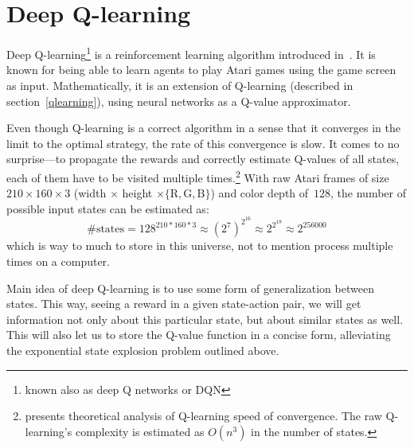 \chapter{Deep Q-learning}\label{dqn}
Deep Q-learning\footnote{known also as deep Q networks or DQN} is a reinforcement learning algorithm introduced in~\cite{nips-dqn}. It is known for being able to learn agents to play Atari games using the game screen as input. Mathematically, it is an extension of Q-learning (described in section~\ref{qlearning}), using neural networks as a Q-value approximator.

Even though Q-learning is a correct algorithm in a sense that it converges in the limit to the optimal strategy, the rate of this convergence is slow. It comes to no surprise---to propagate the rewards and correctly estimate Q-values of all states, each of them have to be visited multiple times.\footnote{\cite{qlearning-complexity} presents theoretical analysis of Q-learning speed of convergence. The raw Q-learning's complexity is estimated as $O(n^3)$ in the number of states.}
With raw Atari frames of size~$210 \times 160 \times 3$ (width $\times$ height $\times \{\text{R}, \text{G}, \text{B}\}$) and color depth of~$128$, the number of possible input states can be estimated as:
\begin{equation}
  \mbox{\# states} = 128^{210*160*3} \approx (2^7)^{2^{16}} \approx 2^{2^{18}} \approx 2^{256000}
\end{equation}\label{number-frame-states}
which is way to much to store in this universe, not to mention process multiple times on a computer.

Main idea of deep Q-learning is to use some form of generalization between states. This way, seeing a reward in a given state-action pair, we will get information not only about this particular state, but about similar states as well. This will also let us to store the Q-value function in a concise form, alleviating the exponential state explosion problem outlined above.

